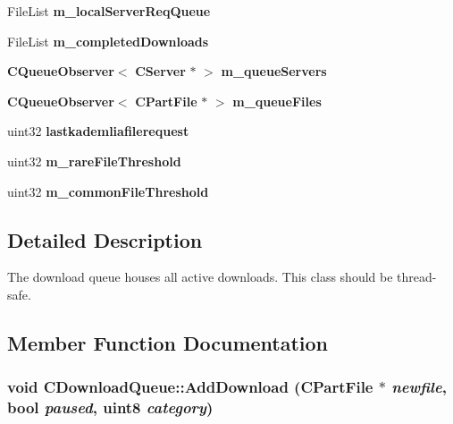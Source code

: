 \begin{DoxyCompactItemize}
\item 
FileList {\bfseries m\_\-localServerReqQueue}\label{classCDownloadQueue_a92718bed8243fa3ed352f5c4dcc37546}

\item 
FileList {\bf m\_\-completedDownloads}\label{classCDownloadQueue_a9b9d788af3a1e621fa7e963c5088cbe2}

\item 
{\bf CQueueObserver}$<$ {\bf CServer} $\ast$ $>$ {\bf m\_\-queueServers}\label{classCDownloadQueue_ae8944a7069097ea35e5b3bceca14cbda}

\item 
{\bf CQueueObserver}$<$ {\bf CPartFile} $\ast$ $>$ {\bf m\_\-queueFiles}\label{classCDownloadQueue_ae0d15dd85e2079d760a010249bca16e5}

\item 
uint32 {\bfseries lastkademliafilerequest}\label{classCDownloadQueue_a2c628c6759f88d571401f8223657d10b}

\item 
uint32 {\bf m\_\-rareFileThreshold}\label{classCDownloadQueue_a0bcf63482507f7f1bb479a9a5a951f33}

\item 
uint32 {\bf m\_\-commonFileThreshold}\label{classCDownloadQueue_a29e4fbf1c95eede560b4b9dede801769}

\end{DoxyCompactItemize}


\subsection{Detailed Description}
The download queue houses all active downloads. This class should be thread-\/safe. 

\subsection{Member Function Documentation}
\subsubsection[{AddDownload}]{\setlength{\rightskip}{0pt plus 5cm}void CDownloadQueue::AddDownload ({\bf CPartFile} $\ast$ {\em newfile}, \/  bool {\em paused}, \/  uint8 {\em category})}\label{classCDownloadQueue_ab6cec8c090865ec4e431fb51ff7d87fc}


